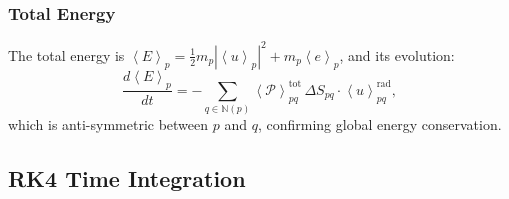 \documentclass[twocolumn]{aastex63}
\newcommand{\vel}{{u}}
\newcommand{\surf}[0]{S}
\newcommand{\pressure}[0]{\mathcal{P}}
\begin{document}
\subsubsection{Total Energy}

The total energy is
$\left<E\right>_p = \tfrac{1}{2}m_p|\left<\vel\right>_p|^2
  + m_p\left<e\right>_p$, and its evolution:
\begin{equation}\label{eq:etot3d}
  \frac{d\left<E\right>_p}{dt}
  = -\sum_{q\in\mathbb{N}(p)}
    \left<\pressure\right>_{pq}^\textrm{tot}
    \,\Delta\surf_{pq}\cdot
    \left<\vel\right>_{pq}^\textrm{rad},
\end{equation}
which is anti-symmetric between $p$ and $q$,
confirming global energy conservation.


\subsection{RK4 Time Integration}
\end{document}
